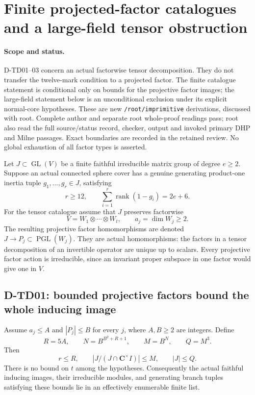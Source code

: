 \section{Finite projected-factor catalogues and a large-field tensor obstruction}
\label{sec:tensor-factor-catalogue}

\paragraph{Scope and status.}
D-TD01--03 concern an actual factorwise tensor decomposition.
They do not transfer the twelve-mark condition to a projected factor.
The finite catalogue statement is conditional only on bounds for the
projective factor images; the large-field statement below is an
unconditional exclusion under its explicit normal-core hypotheses.
These are new \texttt{/root/imprimitive} derivations, discussed with
root. Complete author and separate root whole-proof readings pass;
root also read the full source/status record, checker, output and
invoked primary DHP and Milne passages. Exact boundaries are recorded
in the retained review. No global exhaustion of all factor types is asserted.

Let \(J\subset\operatorname{GL}(V)\) be a finite faithful irreducible
matrix group of degree \(e\ge2\).  Suppose an actual connected sphere
cover has a genuine generating product-one inertia tuple
\(g_1,\ldots,g_r\in J\), satisfying
\[
 r\ge12,\qquad
 \sum_{i=1}^r\operatorname{rank}(1-g_i)=2e+6 .
 \tag{TD.1}
\]
For the tensor catalogue assume that \(J\) preserves factorwise
\[
                    V=W_1\otimes\cdots\otimes W_t,
             \qquad a_j=\dim W_j\ge2 .
                    \tag{TD.2}
\]
The resulting projective factor homomorphisms are denoted
\(J\longrightarrow P_j\subset\operatorname{PGL}(W_j)\).
They are actual homomorphisms: the factors in a tensor decomposition
of an invertible operator are unique up to scalars.
Every projective factor action is irreducible, since an invariant
proper subspace in one factor would give one in \(V\).

\subsection{D-TD01: bounded projective factors bound the whole inducing image}

\begin{theorem}[D-TD01]
Assume \(a_j\le A\) and \(|P_j|\le B\) for every \(j\), where
\(A,B\ge2\) are integers.  Define
\[
 R=5A,\qquad
 N=B^{B^2+R+1},\qquad
 M=B^N,\qquad Q=M^3 .
 \tag{TD.3}
\]
Then
\[
            r\le R,\qquad
       |J/(J\cap\mathbf C^\times I)|\le M,\qquad |J|\le Q .
       \tag{TD.4}
\]
There is no bound on \(t\) among the hypotheses.
Consequently the actual faithful inducing images, their irreducible
modules, and generating branch tuples satisfying these bounds lie in
an effectively enumerable finite list.
\end{theorem}

